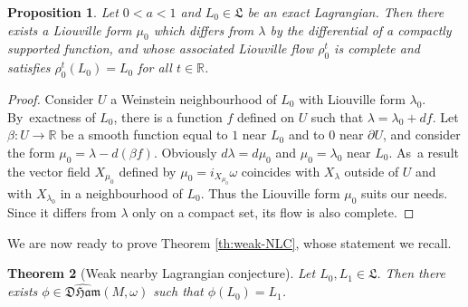 \documentclass[10pt]{amsart}
\newtheorem{thm}{Theorem}[section]
\newtheorem{prop}[thm]{Proposition}
\theoremstyle{definition}
\newcommand{\R}{\mathbb{R}}
\newcommand{\DHam}{\mathfrak{DHam}}
\newcommand{\fL}{\mathfrak {L}}
\begin{document}
\begin{prop} \label{prop:exact-are-fixed-points}
Let $0<a<1$ and $L_{0} \in \fL$ be an exact Lagrangian. Then there exists a Liouville form $\mu_0$ which differs from $\lambda$ by the differential of a compactly supported function, and whose associated Liouville flow $\rho_0^t$ is complete and satisfies $\rho_0^t(L_{0})=L_{0}$ for all $t\in\R$.
\end{prop}

\begin{proof}
Consider $U$ a Weinstein neighbourhood of $L_0$ with Liouville form $\lambda_{0}$. By~exactness of $L_0$, there is a function $f$ defined on $U$ such that $\lambda=\lambda_{0}+ df$.
Let $\beta:U\to\R$ be a smooth function equal to $1$ near $L_{0}$ and to $0$ near $\partial U$, and consider the form $\mu_0 = \lambda - d(\beta f)$. Obviously $d\lambda=d\mu_0$ and $\mu_0 = \lambda_{0}$ near $L_{0}$. As~a result the vector field $X_{\mu_0}$ defined by $\mu_0=i_{X_{\mu_0}}\omega$ coincides with $X_{\lambda}$ outside of $U$ and with $X_{\lambda_{0}}$ in a neighbourhood of $L_0$. Thus the Liouville form $\mu_0$ suits our needs. Since it differs from $\lambda$ only on a compact set, its flow is also complete.
\end{proof}

We are now ready to prove Theorem \ref{th:weak-NLC}, whose statement we recall.
\setcounter{section}{1}
\setcounter{thm}{7}
\begin{thm}[Weak nearby Lagrangian conjecture]\label{Theorem-A4}
Let $L_{0}, L_{1} \in \fL$. Then there exists $\phi \in \widehat{\DHam}(M, \omega)$ such that $\phi(L_{0})=L_{1}$.
\end{thm}
\setcounter{section}{7}
\setcounter{thm}{3}
\end{document}
